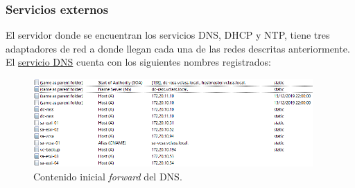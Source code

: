  \subsubsection{Servicios externos}
 El servidor donde se encuentran los servicios DNS, DHCP y NTP, tiene tres adaptadores de red a donde llegan cada una de las redes descritas anteriormente.\\
 El \underline{servicio DNS} cuenta con los siguientes nombres registrados:
         \begin{figure}[h!]
            \centering
            \includegraphics[width=0.95\textwidth]{imaxes/probaConcepto/nombresDNSINIcioFW.png}
            \caption{Contenido inicial \textit{forward} del DNS.} 
            \label{fig:contenidoinicialForwardDNS}
        \end{figure}
        

